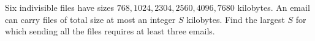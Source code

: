 Six indivisible files have sizes $768,1024,2304,2560,4096,7680$ kilobytes. An email can carry files of total size at most an integer $S$ kilobytes. Find the largest $S$ for which sending all the files requires at least three emails.

